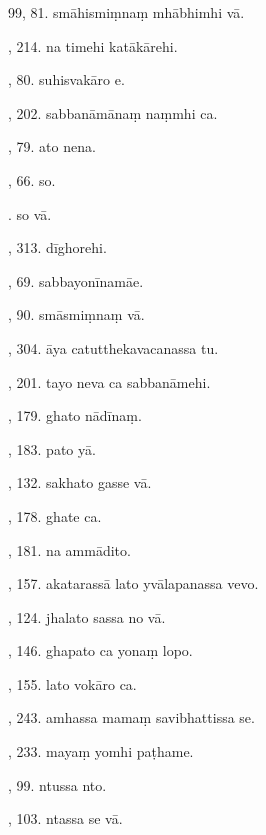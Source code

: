 99, 81. smāhismiṃnaṃ mhābhimhi vā.\hfill \pageref{sut:99}\par {}, 214. na timehi katākārehi.\hfill \pageref{sut:100}\par {}, 80. suhisvakāro e.\hfill \pageref{sut:101}\par {}, 202. sabbanāmānaṃ naṃmhi ca.\hfill \pageref{sut:102}\par {}, 79. ato nena.\hfill \pageref{sut:103}\par {}, 66. so.\hfill \pageref{sut:104}\par {}. so vā.\hfill \pageref{sut:105}\par {}, 313. dīghorehi.\hfill \pageref{sut:106}\par {}, 69. sabbayonīnamāe.\hfill \pageref{sut:107}\par {}, 90. smāsmiṃnaṃ vā.\hfill \pageref{sut:108}\par {}, 304. āya catutthekavacanassa tu.\hfill \pageref{sut:109}\par {}, 201. tayo neva ca sabbanāmehi.\hfill \pageref{sut:110}\par {}, 179. ghato nādīnaṃ.\hfill \pageref{sut:111}\par {}, 183. pato yā.\hfill \pageref{sut:112}\par {}, 132. sakhato gasse vā.\hfill \pageref{sut:113}\par {}, 178. ghate ca.\hfill \pageref{sut:114}\par {}, 181. na ammādito.\hfill \pageref{sut:115}\par {}, 157. akatarassā lato yvālapanassa vevo.\hfill \pageref{sut:116}\par {}, 124. jhalato sassa no vā.\hfill \pageref{sut:117}\par {}, 146. ghapato ca yonaṃ lopo.\hfill \pageref{sut:118}\par {}, 155. lato vokāro ca.\hfill \pageref{sut:119}\par {}, 243. amhassa mamaṃ savibhattissa se.\hfill \pageref{sut:120}\par {}, 233. mayaṃ yomhi paṭhame.\hfill \pageref{sut:121}\par {}, 99. ntussa nto.\hfill \pageref{sut:122}\par {}, 103. ntassa se vā.\hfill \pageref{sut:123}\par \noindent
